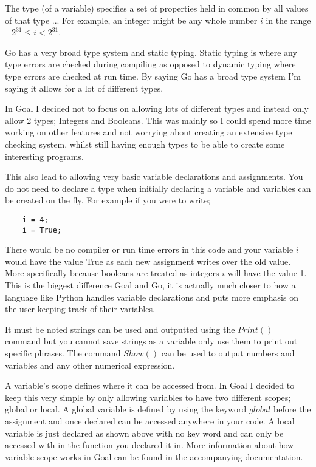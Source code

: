 \begin{displayquote}
The type (of a variable) specifies a set of properties held in common by all values of that type ... For example, an integer might be any whole number $i$ in the range $-2^{31} \leq i < 2^{31}$.
\end{displayquote}

Go has a very broad type system and static typing. Static typing is where any type errors are checked during compiling as opposed to dynamic typing where type errors are checked at run time. By saying Go has a broad type system I'm saying it allows for a lot of different types.

In Goal I decided not to focus on allowing lots of different types and instead only allow 2 types; Integers and Booleans. This was mainly so I could spend more time working on other features and not worrying about creating an extensive type checking system, whilst still having enough types to be able to create some interesting programs.

This also lead to allowing very basic variable declarations and assignments. You do not need to declare a type when initially declaring a variable and variables can be created on the fly. For example if you were to write;

\begin{lstlisting}
	i = 4;
	i = True;
\end{lstlisting}

There would be no compiler or run time errors in this code and your variable $i$ would have the value True as each new assignment writes over the old value. More specifically because booleans are treated as integers $i$ will have the value 1.  This is the biggest difference Goal and Go, it is actually much closer to how a language like Python handles variable declarations and puts more emphasis on the user keeping track of their variables.

It must be noted strings can be used and outputted using the $Print()$ command but you cannot save strings as a variable only use them to print out specific phrases. The command $Show()$ can be used to output numbers and variables and any other numerical expression. 

A variable's scope defines where it can be accessed from. In Goal I decided to keep this very simple by only allowing variables to have two different scopes; global or local. A global variable is defined by using the keyword $global$ before the assignment and once declared can be accessed anywhere in your code. A local variable is just declared as shown above with no key word and can only be accessed with in the function you declared it in. More information about how variable scope works in Goal can be found in the accompanying documentation.     

